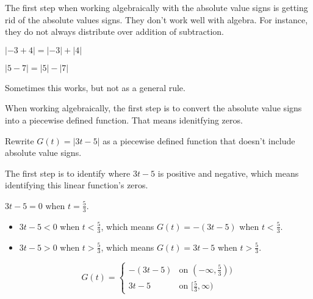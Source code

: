 \documentclass{ximera}
\begin{document}
The first step when working algebraically with the absolute value signs is getting rid of the absolute values signs.  They don't work well with algebra. For instance, they do not always distribute over addition of subtraction.


\begin{question}
$| -3 + 4 | = | -3 | + | 4 |$
  \begin{multipleChoice}
  \end{multipleChoice}
\end{question}


\begin{question}
$| 5 - 7 | = | 5 | - | 7 |$
  \begin{multipleChoice}
  \end{multipleChoice}
\end{question}


Sometimes this works, but not as a general rule.


When working algebraically, the first step is to convert the absolute value signs into a piecewise defined function. That means idenitfying zeros.



\begin{example}


Rewrite $G(t) = | 3t - 5 |$ as a piecewise defined function that doesn't include absolute value signs.


The first step is to identify where $3t - 5$ is positive and negative, which means identifying this linear function's zeros.



$3t-5=0$ when $t=\frac{5}{3}$.


\begin{itemize}
\item $3t - 5 < 0$ when $t<\tfrac{5}{3}$, which means $G(t) = -(3t - 5)$ when $t<\tfrac{5}{3}$.
\item $3t - 5 > 0$ when $t>\tfrac{5}{3}$, which means $G(t) = 3t - 5$ when $t>\tfrac{5}{3}$.
\end{itemize}





\[
G(t) = 
\begin{cases}
  -(3t-5) &\text{on $(-\infty, \tfrac{5}{3})$)} \\
  3t-5 &\text{on $[\tfrac{5}{3}, \infty)$}
\end{cases}
\]






\end{example}
\end{document}
